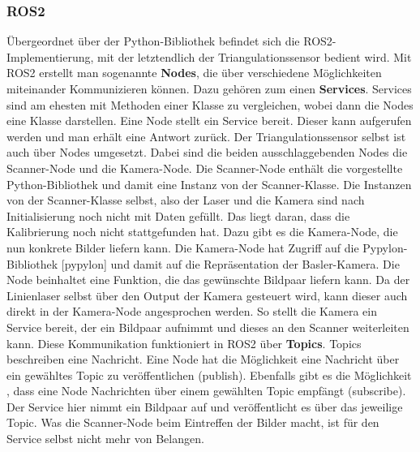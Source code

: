 		\subsubsection{ROS2}
		
		Übergeordnet über der Python-Bibliothek befindet sich die ROS2-Implementierung, mit der letztendlich der Triangulationssensor bedient wird. Mit ROS2 erstellt man sogenannte \textbf{Nodes}, die über verschiedene Möglichkeiten miteinander Kommunizieren können. Dazu gehören zum einen \textbf{Services}. Services sind am ehesten mit Methoden einer Klasse zu vergleichen, wobei dann die Nodes eine Klasse darstellen. Eine Node stellt ein Service bereit. Dieser kann aufgerufen werden und man erhält eine Antwort zurück. Der Triangulationssensor selbst ist auch über Nodes umgesetzt. Dabei sind die beiden ausschlaggebenden Nodes die Scanner-Node und die Kamera-Node. Die Scanner-Node enthält die vorgestellte Python-Bibliothek und damit eine Instanz von der Scanner-Klasse. Die Instanzen von der Scanner-Klasse selbst, also der Laser und die Kamera sind nach Initialisierung noch nicht mit Daten gefüllt. Das liegt daran, dass die Kalibrierung noch nicht stattgefunden hat. Dazu gibt es die Kamera-Node, die nun konkrete Bilder liefern kann. Die Kamera-Node hat Zugriff auf die Pypylon-Bibliothek [pypylon] und damit auf die Repräsentation der Basler-Kamera. Die Node beinhaltet eine Funktion, die das gewünschte Bildpaar liefern kann. Da der Linienlaser selbst über den Output der Kamera gesteuert wird, kann dieser auch direkt in der Kamera-Node angesprochen werden. So stellt die Kamera ein Service bereit, der ein Bildpaar aufnimmt und dieses an den Scanner weiterleiten kann. \newline
		Diese Kommunikation funktioniert in ROS2 über \textbf{Topics}. Topics beschreiben eine Nachricht. Eine Node hat die Möglichkeit eine Nachricht über ein gewähltes Topic zu veröffentlichen (publish). Ebenfalls gibt es die Möglichkeit , dass eine Node Nachrichten über einem gewählten Topic empfängt (subscribe). Der Service hier nimmt ein Bildpaar auf und veröffentlicht es über das jeweilige Topic. Was die Scanner-Node beim Eintreffen der Bilder macht, ist für den Service selbst nicht mehr von Belangen.\newline
